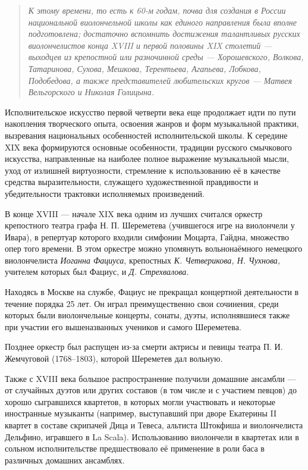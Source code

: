 \documentclass[12pt,a4paper,oneside,titlepage,draft]{extreport}
\begin{document}
		\begin{quotation}
		\textit{К этому времени, то есть к 60-м годам, почва для 
создания в России национальной виолончельной школы как
единого направления была вполне подготовлена; достаточно
вспомнить достижения талантливых русских виолончелистов
конца XVIII и первой половины XIX столетий — выходцев из
крепостной или разночинной среды — Хорошевского, 
Волкова, Татаринова, Сухова, Мешкова, Терентьева, Агапьева,
Лобкова, Подобедова, а также представителей 
любительских кругов — Матвея Вельгорского и Николая Голицына.} %
		\end{quotation}
		
		Исполнительское искусство первой 
четверти века еще продолжает идти по пути накопления творческого опыта, освоения жанров и форм музыкальной практики, вызревания национальных особенностей исполнительской школы.				
		К середине XIX века формируются основные особенности, традиции русского смычкового искусства, направленные на наиболее полное выражение музыкальной мысли, уход от излишней виртуозности, стремление к использованию её в 
качестве средства выразительности, служащего художественной
правдивости и убедительности трактовки исполняемых 
произведений.
		
		В конце XVIII --- начале XIX века одним из лучших считался оркестр крепостного театра графа Н. П. Шереметева (учившегося игре на виолончели у Ивара), в репертуар которого входили симфонии Моцарта, Гайдна, множество опер того времени. В этом оркестре можно упомянуть вольнонаёмного немецкого виолончелиста \emph{Иоганна Фациуса}, крепостных \emph{К. Четверикова, Н. Чухнова,} учителем которых был Фациус, и \emph{Д. Стрехвалова.}
		
Находясь в Москве на службе, Фациус не прекращал концертной деятельности в течение порядка 25 лет. Он играл 
преимущественно свои сочинения, среди которых были виолончельные
концерты, сонаты, дуэты, исполнявшиеся также при участии его вышеназванных учеников и самого Шереметева.%

Позднее оркестр был распущен из-за смерти актрисы и певицы театра П. И. Жемчуговой (1768--1803), которой Шереметев дал вольную.

Также с XVIII века большое распространение получили домашние ансамбли --- от случайных дуэтов или других составов
(в том числе и с участием певцов) до хорошо сыгравшихся квартетов, в которых могли участвовать и некоторые иностранные музыканты (например, выступавший при дворе Екатерины II квартет в составе скрипачей Дица и Тевеса, альтиста Штокфиша и виолончелиста Дельфино, игравшего в La Scala). Использованию
виолончели в квартетах или в сольном исполнительстве 
предшествовало её применение в роли баса в различных домашних 
ансамблях.
\end{document}
